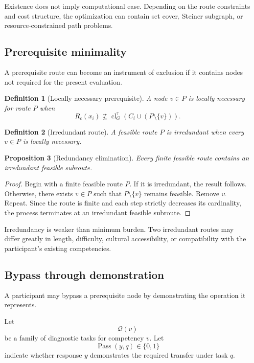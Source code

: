 \documentclass[11pt]{article}
\newtheorem{definition}{Definition}[section]
\newtheorem{proposition}[definition]{Proposition}
\theoremstyle{definition}
\DeclareMathOperator{\closure}{cl}
\begin{document}
Existence does not imply computational ease. Depending on the route constraints and cost structure, the optimization can contain set cover, Steiner subgraph, or resource-constrained path problems.

\subsection{Prerequisite minimality}

A prerequisite route can become an instrument of exclusion if it contains nodes not required for the present evaluation.

\begin{definition}[Locally necessary prerequisite]
A node \(v\in P\) is locally necessary for route \(P\) when
\[
R_c(x_i)
\not\subseteq
\closure_G^\tau(C_i\cup(P\setminus\{v\})).
\]
\end{definition}

\begin{definition}[Irredundant route]
A feasible route \(P\) is irredundant when every \(v\in P\) is locally necessary.
\end{definition}

\begin{proposition}[Redundancy elimination]
Every finite feasible route contains an irredundant feasible subroute.
\end{proposition}

\begin{proof}
Begin with a finite feasible route \(P\). If it is irredundant, the result follows. Otherwise, there exists \(v\in P\) such that \(P\setminus\{v\}\) remains feasible. Remove \(v\). Repeat. Since the route is finite and each step strictly decreases its cardinality, the process terminates at an irredundant feasible subroute.
\end{proof}

Irredundancy is weaker than minimum burden. Two irredundant routes may differ greatly in length, difficulty, cultural accessibility, or compatibility with the participant's existing competencies.

\subsection{Bypass through demonstration}

A participant may bypass a prerequisite node by demonstrating the operation it represents.

Let
\[
\mathcal Q(v)
\]
be a family of diagnostic tasks for competency \(v\). Let
\[
\operatorname{Pass}(y,q)
\in\{0,1\}
\]
indicate whether response \(y\) demonstrates the required transfer under task \(q\).
\end{document}
